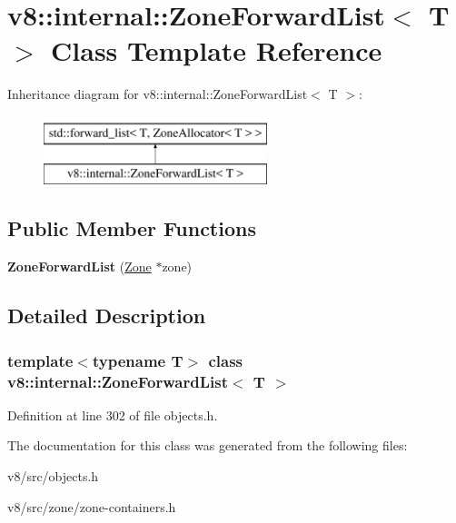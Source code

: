 \hypertarget{classv8_1_1internal_1_1ZoneForwardList}{}\section{v8\+:\+:internal\+:\+:Zone\+Forward\+List$<$ T $>$ Class Template Reference}
\label{classv8_1_1internal_1_1ZoneForwardList}
Inheritance diagram for v8\+:\+:internal\+:\+:Zone\+Forward\+List$<$ T $>$\+:\begin{figure}[H]
\begin{center}
\leavevmode
\includegraphics[height=2.000000cm]{classv8_1_1internal_1_1ZoneForwardList}
\end{center}
\end{figure}
\subsection*{Public Member Functions}
\begin{DoxyCompactItemize}
\item 
\mbox{\label{classv8_1_1internal_1_1ZoneForwardList_a202bd1507db1a78ca40433744a58a907}} 
{\bfseries Zone\+Forward\+List} (\mbox{\hyperlink{classv8_1_1internal_1_1Zone}{Zone}} $\ast$zone)
\end{DoxyCompactItemize}


\subsection{Detailed Description}
\subsubsection*{template$<$typename T$>$\newline
class v8\+::internal\+::\+Zone\+Forward\+List$<$ T $>$}



Definition at line 302 of file objects.\+h.



The documentation for this class was generated from the following files\+:\begin{DoxyCompactItemize}
\item 
v8/src/objects.\+h\item 
v8/src/zone/zone-\/containers.\+h\end{DoxyCompactItemize}
